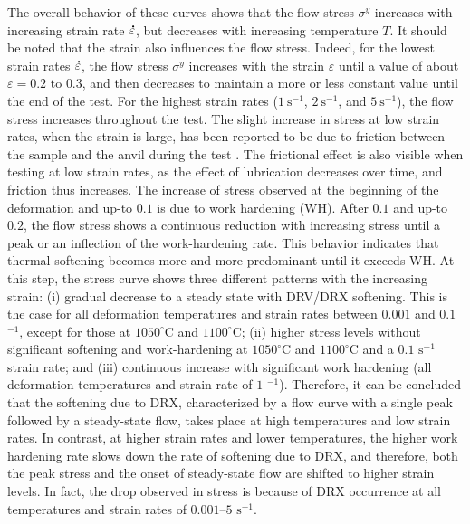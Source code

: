 \documentclass[metals,article,submit,pdftex,moreauthors]{Definitions/mdpi}
\DeclareRobustCommand{\mdot}[1]{\accentset{\mbox{\bfseries .}}{#1}}
\DeclareRobustCommand{\ps}{\text{s}^{-1}}
\begin{document}
The overall behavior of these curves shows that the flow stress $\sigma^y$ increases with increasing strain rate $\mdot\varepsilon$, but decreases with increasing temperature $T$.
It should be noted that the strain also influences the flow stress.
Indeed, for the lowest strain rates $\mdot\varepsilon$, the flow stress $\sigma^y$ increases with the strain $\varepsilon$ until a value of about $\varepsilon=0.2$ to $0.3$, and then decreases to maintain a more or less constant value until the end of the test.
For the highest strain rates ($1~\ps$, $2~\ps$, and $5~\ps$), the flow stress increases throughout the test.
The slight increase in stress at low strain rates, when the strain is large, has been reported to be due to friction between the sample and the anvil during the test \cite{galos2022review}.
The frictional effect is also visible when testing at low strain rates, as the effect of lubrication decreases over time, and friction thus increases.
The increase of stress observed at the beginning of the deformation and up-to $0.1$ is due to work hardening (WH).
After $0.1$ and up-to $0.2$, the flow stress shows a continuous reduction with increasing stress until a peak or an inflection of the work-hardening rate.
This behavior indicates that thermal softening becomes more and more predominant until it exceeds WH.
At this step, the stress curve shows three different patterns with the increasing strain: (i) gradual decrease to a steady state with DRV/DRX softening.
This is the case for all deformation temperatures and strain rates between $0.001$ and $0.1$ $^{-1}$, except for those at $1050^\circ$C and $1100^\circ$C; (ii) higher stress levels without significant softening and work-hardening at $1050^\circ$C and $1100^\circ$C and a $0.1$ $\text{s}^{-1}$ strain rate; and (iii) continuous increase with significant work hardening (all deformation temperatures and strain rate of $1$ $^{-1}$).
Therefore, it can be concluded that the softening due to DRX, characterized by a flow curve with a single peak followed by a steady-state flow, takes place at high temperatures and low strain rates.
In contrast, at higher strain rates and lower temperatures, the higher work hardening rate slows down the rate of softening due to DRX, and therefore, both the peak stress and the onset of steady-state flow are shifted to higher strain levels.
In fact, the drop observed in
stress is because of DRX occurrence at all temperatures and strain rates of $0.001$–$5$ $\text{s}^{-1}$.
\end{document}
